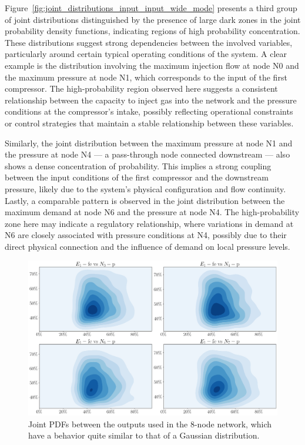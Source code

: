Figure~\cref{fig:joint_distributions_input_input_wide_mode} presents a third group of joint distributions distinguished by the presence of large dark zones in the joint probability density functions, indicating regions of high probability concentration. These distributions suggest strong dependencies between the involved variables, particularly around certain typical operating conditions of the system.
A clear example is the distribution involving the maximum injection flow at node N0 and the maximum pressure at node N1, which corresponds to the input of the first compressor. The high-probability region observed here suggests a consistent relationship between the capacity to inject gas into the network and the pressure conditions at the compressor’s intake, possibly reflecting operational constraints or control strategies that maintain a stable relationship between these variables.


Similarly, the joint distribution between the maximum pressure at node N1 and the pressure at node N4 — a pass-through node connected downstream — also shows a dense concentration of probability. This implies a strong coupling between the input conditions of the first compressor and the downstream pressure, likely due to the system’s physical configuration and flow continuity.
Lastly, a comparable pattern is observed in the joint distribution between the maximum demand at node N6 and the pressure at node N4. The high-probability zone here may indicate a regulatory relationship, where variations in demand at N6 are closely associated with pressure conditions at N4, possibly due to their direct physical connection and the influence of demand on local pressure levels.



\begin{figure}
    \begin{center}
        \includegraphics[width=.75\textwidth]{figures/Chapter_NonLinealCensnet/outputs_outputs_1.png}
    \end{center}
    \caption{Joint PDFs between the outputs used in the 8-node network, which have a behavior quite similar to that of a Gaussian distribution.}
    \label{fig:joint_distributions_output_output_1}
\end{figure}


